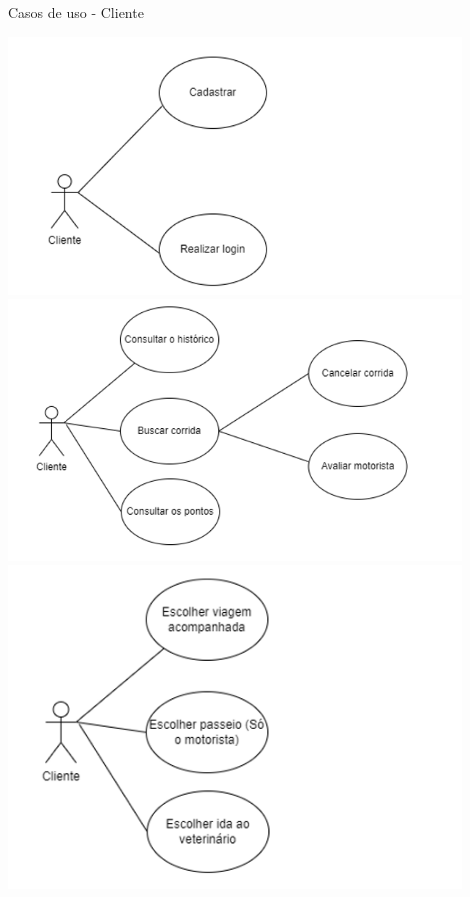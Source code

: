 \newpage
    \caption{Casos de uso - Cliente}
	\includegraphics[width=0.9\textwidth]{exemplos/diagramas/Casos de uso_Cliente 1.PNG}
	\includegraphics[width=0.9\textwidth]{exemplos/diagramas/Casos de uso_Cliente 2.PNG}
	\includegraphics[width=0.9\textwidth]{exemplos/diagramas/Casos de uso_Cliente 3.PNG}

